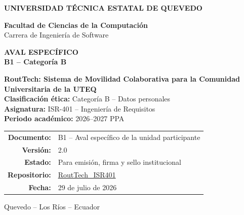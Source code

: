 \documentclass[11pt,a4paper]{article}
\newcommand{\Proyecto}{RoutTech: Sistema de Movilidad Colaborativa para la Comunidad Universitaria de la UTEQ}
\newcommand{\Asignatura}{ISR-401 -- Ingeniería de Requisitos}
\newcommand{\Periodo}{2026--2027 PPA}
\newcommand{\CategoriaEtica}{Categoría B -- Datos personales}
\newcommand{\Repositorio}{https://github.com/AnderJM3/RoutTech_ISR401}
\newcommand{\FechaDocumento}{29 de julio de 2026}
\newcommand{\VersionDocumento}{2.0}
\begin{document}
\justifying

\thispagestyle{empty}

\vspace*{0.65cm}
\begin{center}
{\color{white}\Large\bfseries UNIVERSIDAD TÉCNICA ESTATAL DE QUEVEDO}

\vspace{1.75cm}
{\large\bfseries\color{RTForest} Facultad de Ciencias de la Computación\\[4pt]}
{\normalsize\color{RTGray} Carrera de Ingeniería de Software}

\vspace{0.8cm}

{\Huge\bfseries\color{RTForest} AVAL ESPECÍFICO\\[8pt]}
{\Large\bfseries\color{RTTerracotta} B1 -- Categoría B}

\vspace{1.0cm}

\begin{tcolorbox}[width=0.90\textwidth,colback=RTCream,colframe=RTGold,boxrule=1pt,arc=2mm]
\centering
{\large\bfseries \Proyecto}\\[7pt]
\textbf{Clasificación ética:} \CategoriaEtica\\
\textbf{Asignatura:} \Asignatura\\
\textbf{Periodo académico:} \Periodo
\end{tcolorbox}

\vfill
\begin{tabular}{rl}
\textbf{Documento:} & B1 -- Aval específico de la unidad participante\\
\textbf{Versión:} & \VersionDocumento\\
\textbf{Estado:} & Para emisión, firma y sello institucional\\
\textbf{Repositorio:} & \href{\Repositorio}{RoutTech\_ISR401}\\
\textbf{Fecha:} & \FechaDocumento
\end{tabular}

\vspace{0.75cm}
{\small Quevedo -- Los Ríos -- Ecuador}
\end{center}
\clearpage
\end{document}

